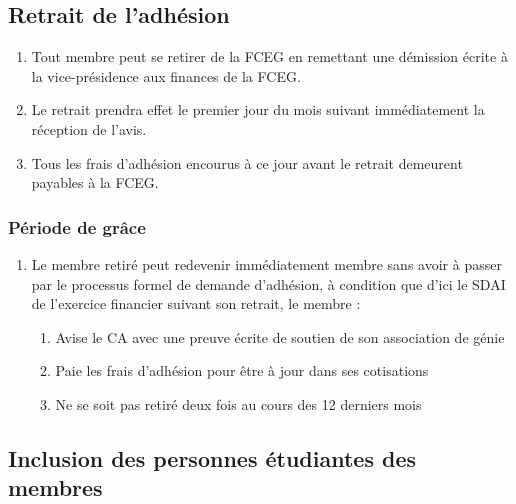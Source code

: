 \subsection{Retrait de l'adhésion}
\label{adhesion-retrait-de-l-adhesion}

\begin{enumerate}
 \item Tout membre peut se retirer de la FCEG en remettant une démission écrite à la vice-présidence aux finances de la FCEG.
 \item Le retrait prendra effet le premier jour du mois suivant immédiatement la réception de l'avis.
 \item Tous les frais d'adhésion encourus à ce jour avant le retrait demeurent payables à la FCEG.
\end{enumerate}

\setcounter{subsubsection}{3}
\subsubsection{Période de grâce}
\label{retrait-de-l-adhesion-periode-de-grace}

\begin{enumerate}
 \item Le membre retiré peut redevenir immédiatement membre sans avoir à passer par le processus formel de demande d'adhésion, à condition que d'ici le SDAI de l'exercice financier suivant son retrait, le membre :
  \begin{enumerate}
   \item Avise le CA avec une preuve écrite de soutien de son association de génie
   \item Paie les frais d'adhésion pour être à jour dans ses cotisations
   \item Ne se soit pas retiré deux fois au cours des 12 derniers mois
  \end{enumerate}
\end{enumerate}

\subsection{Inclusion des personnes étudiantes des membres}
\label{adhesion-inclusion-des-personnes-etudiantes-des-membres}

